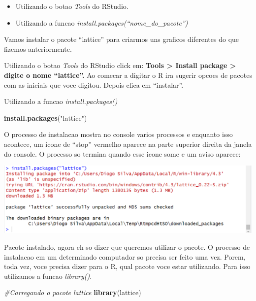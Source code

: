\documentclass[
]{book}
\newenvironment{Shaded}{\begin{snugshade}}{\end{snugshade}}
\newcommand{\CommentTok}[1]{\textcolor[rgb]{0.56,0.35,0.01}{\textit{#1}}}
\newcommand{\FunctionTok}[1]{\textcolor[rgb]{0.13,0.29,0.53}{\textbf{#1}}}
\newcommand{\NormalTok}[1]{#1}
\newcommand{\StringTok}[1]{\textcolor[rgb]{0.31,0.60,0.02}{#1}}
\providecommand{\tightlist}{%
  \setlength{\itemsep}{0pt}\setlength{\parskip}{0pt}}
\begin{document}
\begin{itemize}
\tightlist
\item
  Utilizando o botao \emph{Tools} do RStudio.\\
\item
  Utilizando a funcao \emph{install.packages(``nome\_do\_pacote'')}
\end{itemize}

Vamos instalar o pacote ``lattice'' para criarmos uns graficos diferentes do que fizemos anteriormente.

Utilizando o botao \emph{Tools} do RStudio click em: \textbf{Tools \textgreater{} Install package \textgreater{} digite o nome ``lattice''.} Ao comecar a digitar o R ira sugerir opcoes de pacotes com as iniciais que voce digitou. Depois clica em ``instalar''.

Utilizando a funcao \emph{install.packages()}

\begin{Shaded}
\begin{Highlighting}[]
\FunctionTok{install.packages}\NormalTok{(}\StringTok{"lattice"}\NormalTok{)}
\end{Highlighting}
\end{Shaded}

O processo de instalacao mostra no console varios processos e enquanto isso acontece, um icone de ``stop'' vermelho aparece na parte superior direita da janela do console. O processo so termina quando esse icone some e um aviso aparece:

\includegraphics{img/install_package.png}

Pacote instalado, agora eh so dizer que queremos utilizar o pacote. O processo de instalacao em um determinado computador so precisa ser feito uma vez. Porem, toda vez, voce precisa dizer para o R, qual pacote voce estar utilizando. Para isso utilizamos a funcao \emph{library()}.

\begin{Shaded}
\begin{Highlighting}[]
\CommentTok{\#Carregando o pacote lattice}
\FunctionTok{library}\NormalTok{(lattice)}
\end{Highlighting}
\end{Shaded}
\end{document}
